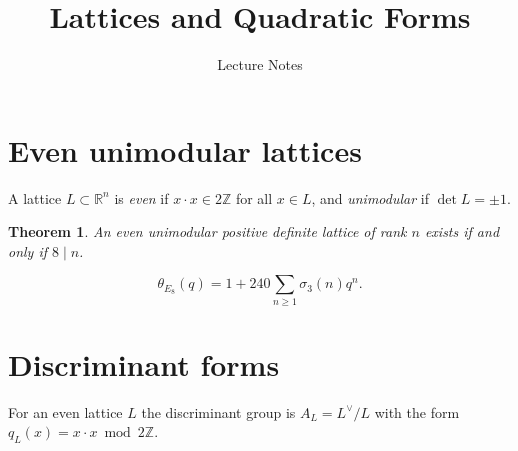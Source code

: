 \documentclass{article}
\title{Lattices and Quadratic Forms}
\author{Lecture Notes}
\date{}
\newtheorem{theorem}{Theorem}
\begin{document}
\maketitle
\section{Even unimodular lattices}
A lattice $L \subset \mathbb{R}^n$ is \emph{even} if $x \cdot x \in 2\mathbb{Z}$ for all $x \in L$,
and \emph{unimodular} if $\det L = \pm 1$.
\begin{theorem}
An even unimodular positive definite lattice of rank $n$ exists if and only if $8 \mid n$.
\end{theorem}
\[ \theta_{E_8}(q) = 1 + 240 \sum_{n \geq 1} \sigma_3(n) q^n. \]
\newpage
\section{Discriminant forms}
For an even lattice $L$ the discriminant group is $A_L = L^\vee / L$ with the form
$q_L(x) = x \cdot x \bmod 2\mathbb{Z}$.
\end{document}
